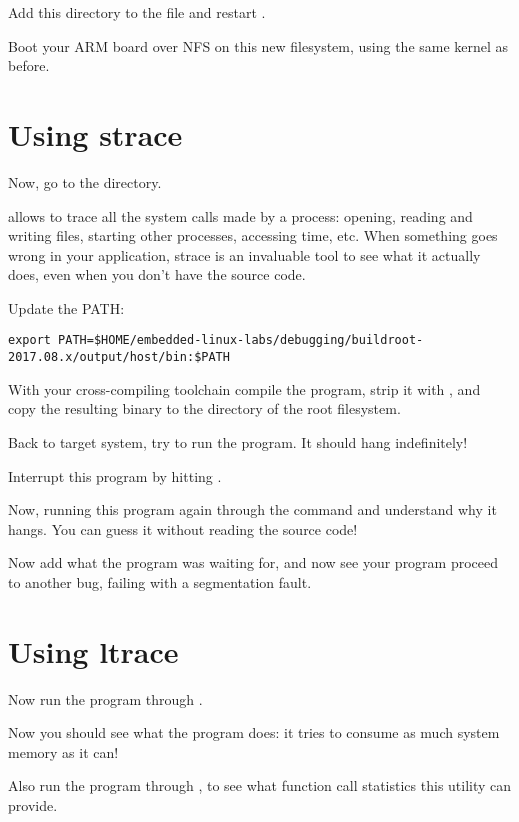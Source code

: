 Add this directory to the  file and restart
.

Boot your ARM board over NFS on this new filesystem, using the same
kernel as before.

\section{Using strace}

Now, go to the  directory.

 allows to trace all the system calls made by a process:
opening, reading and writing files, starting other processes,
accessing time, etc. When something goes wrong in your application,
strace is an invaluable tool to see what it actually does, even when
you don't have the source code.


Update the PATH:
\footnotesize
\begin{verbatim}
export PATH=$HOME/embedded-linux-labs/debugging/buildroot-2017.08.x/output/host/bin:$PATH
\end{verbatim}
\normalsize

With your cross-compiling toolchain
compile the  program, strip it with
, and copy the resulting binary to the
 directory of the root filesystem.

Back to target system, try to run the 
program. It should hang indefinitely!

Interrupt this program by hitting \code{[Ctrl] [C]}.

Now, running this program again through the  command and
understand why it hangs. You can guess it without reading the source
code!

Now add what the program was waiting for, and now see your program
proceed to another bug, failing with a segmentation fault.

\section{Using ltrace}

Now run the program through .

Now you should see what the program does: it tries to consume as much
system memory as it can!

Also run the program through , to see what function call
statistics this utility can provide.

